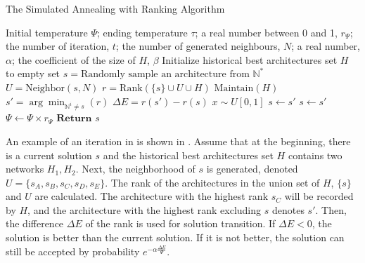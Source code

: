 \documentclass[sigconf]{acmart}
\begin{document}
    \begin{algorithm}[h]
        \caption{The Simulated Annealing with Ranking Algorithm}\label{alg:SA}
        \begin{algorithmic}[1]
            \Parameter Initial temperature $\Psi$; ending temperature $\tau$; a real number between 0 and 1, $r_\Psi$; the number of iteration, $t$; the number of generated neighbours, $N$; a real number, $\alpha$; the coefficient of the size of $H$, $\beta$
            \State Initialize historical best architectures set $H$ to empty set
            \State $s=\text{Randomly sample an architecture from }\mathbb N^*$
            \While{$\Psi>\tau$}
                    \State $U = \text{Neighbor}(s, N)$
                    \State $r=\text{Rank}(\{s\}\cup U\cup H)$
                    \State $\text{Maintain}(H)$
                    \State $s'=\arg\min_{\mathbb N^i\neq s}(r)$
                    \State $\Delta E=r(s')-r(s)$
                    \State $x\sim U[0,1]$
                        \State $s\leftarrow s'$
                            \State $s\leftarrow s'$
                    \EndIf
                \EndFor
                \State $\Psi\leftarrow \Psi\times r_\Psi$
            \EndWhile
            \State $\textbf{Return }s$ 
        \end{algorithmic}
    \end{algorithm}

    An example of an iteration in \palg{} is shown in . 
    Assume that at the beginning, there is a current solution $s$ and the historical best 
    architectures set $H$ contains two networks $H_1, H_2$. Next, the neighborhood of $s$ is generated, 
    denoted $U=\{s_A,s_B,s_C,s_D,s_E\}$. The rank of the architectures in the union 
    set of $H$, $\{s\}$ and $U$ are calculated. The architecture with the highest rank 
    $s_C$ will be recorded by $H$, and the architecture with the highest rank excluding 
    $s$ denotes $s'$. Then, the difference $\Delta E$ of the rank is used for 
    solution transition. If $\Delta E<0$, the solution is better than the current 
    solution. If it is not better, the solution can still be accepted by probability 
    $e^{-\alpha\frac{\Delta E}{\Psi}}$. 
    
\end{document}
